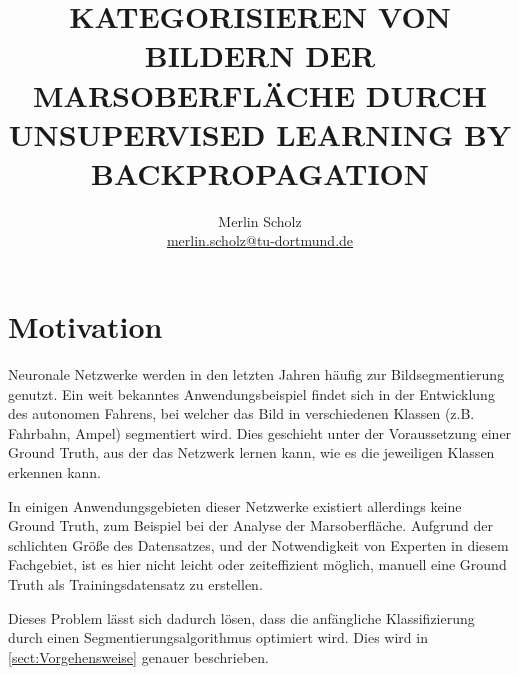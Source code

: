 \documentclass[a4paper,twocolumn,abstract,DIV=16]{scrartcl}
\title{\uppercase{Kategorisieren von Bildern der Marsoberfläche durch Unsupervised Learning by Backpropagation}}
\author{Merlin Scholz\\\small\href{mailto:merlin.scholz@tu-dortmund.de}{merlin.scholz@tu-dortmund.de}}
\date{}
\begin{document}

\section{Motivation}

Neuronale Netzwerke werden in den letzten Jahren häufig zur Bildsegmentierung genutzt. Ein weit bekanntes Anwendungsbeispiel findet sich in der Entwicklung des autonomen Fahrens, bei welcher das Bild in verschiedenen Klassen (z.B. Fahrbahn, Ampel) segmentiert wird. Dies geschieht unter der Voraussetzung einer Ground Truth, aus der das Netzwerk lernen kann, wie es die jeweiligen Klassen erkennen kann.

In einigen Anwendungsgebieten dieser Netzwerke existiert allerdings keine Ground Truth, zum Beispiel bei der Analyse der Marsoberfläche. Aufgrund der schlichten Größe des Datensatzes, und der Notwendigkeit von Experten in diesem Fachgebiet, ist es hier nicht leicht oder zeiteffizient möglich, manuell eine Ground Truth als Trainingsdatensatz zu erstellen.

Dieses Problem lässt sich dadurch lösen, dass die anfängliche Klassifizierung durch einen Segmentierungsalgorithmus optimiert wird. Dies wird in \autoref{sect:Vorgehensweise} genauer beschrieben.
\end{document}
